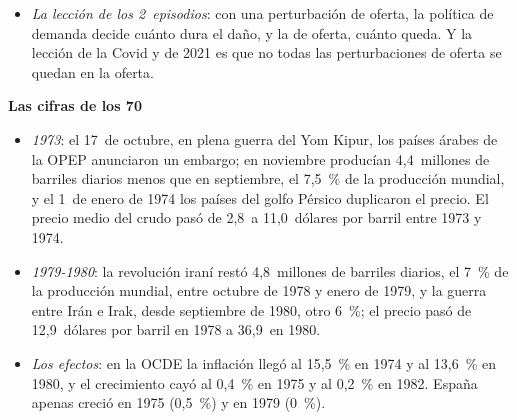 \documentclass[11pt]{article}
\begin{document}
\begin{itemize}
\begin{itemize}
  \end{itemize}
\item \emph{La lección de los 2~episodios}: con una perturbación de oferta, la política de demanda decide cuánto dura el daño, y la de oferta, cuánto queda. Y la lección de la Covid y de 2021 es que no todas las perturbaciones de oferta se quedan en la oferta.
\end{itemize}

\begin{anotaciones}
\textbf{Las cifras de los 70}
\begin{itemize}
\item \emph{1973}: el 17~de octubre, en plena guerra del Yom Kipur, los países árabes de la OPEP anunciaron un embargo; en noviembre producían 4,4~millones de barriles diarios menos que en septiembre, el 7,5~\% de la producción mundial, y el 1~de enero de 1974 los países del golfo Pérsico duplicaron el precio\nocite{Hamilton2011Historical}. El precio medio del crudo pasó de 2,8~a 11,0~dólares por barril entre 1973 y 1974\nocite{BancoMundial2026PinkSheet}.
\item \emph{1979-1980}: la revolución iraní restó 4,8~millones de barriles diarios, el 7~\% de la producción mundial, entre octubre de 1978 y enero de 1979, y la guerra entre Irán e Irak, desde septiembre de 1980, otro 6~\%\nocite{Hamilton2011Historical}; el precio pasó de 12,9~dólares por barril en 1978 a 36,9~en 1980\nocite{BancoMundial2026PinkSheet}.
\item \emph{Los efectos}: en la OCDE la inflación llegó al 15,5~\% en 1974 y al 13,6~\% en 1980, y el crecimiento cayó al 0,4~\% en 1975 y al 0,2~\% en 1982\nocite{BancoMundial2026WDIhist}. España apenas creció en 1975 (0,5~\%) y en 1979 (0~\%)\nocite{CE2026AMECO}.
\end{itemize}
\end{anotaciones}
\end{document}
